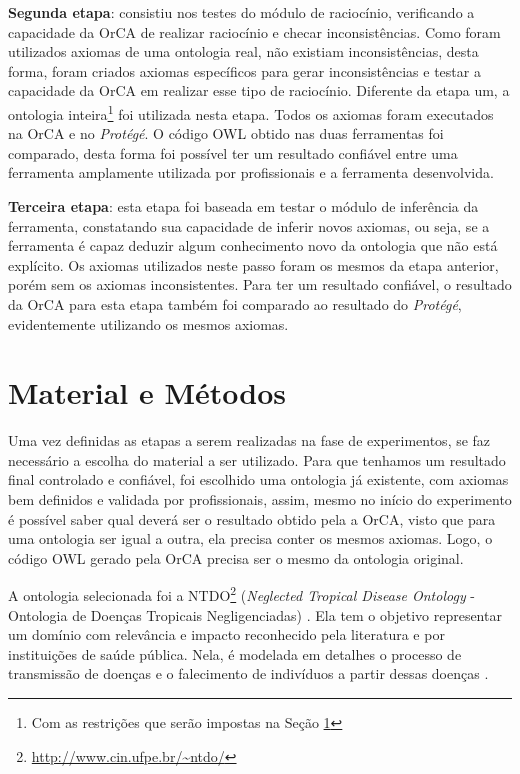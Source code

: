 \documentclass{bcc}
\begin{document}
\textbf{Segunda etapa}: consistiu nos testes do módulo de raciocínio, verificando a capacidade da OrCA de realizar raciocínio e checar inconsistências. Como foram utilizados axiomas de uma ontologia real, não existiam inconsistências, desta forma, foram criados axiomas específicos para gerar inconsistências e testar a capacidade da OrCA em realizar esse tipo de raciocínio. Diferente da etapa um, a ontologia inteira\footnote{Com as restrições que serão impostas na Seção \ref{sec:materialemetodo}} foi utilizada nesta etapa. Todos os axiomas foram executados na OrCA e no \textit{Protégé}. O código OWL obtido nas duas ferramentas foi comparado, desta forma foi possível ter um resultado confiável entre uma ferramenta amplamente utilizada por profissionais e a ferramenta desenvolvida.

\textbf{Terceira etapa}: esta etapa foi baseada em testar o módulo de inferência da ferramenta, constatando sua capacidade de inferir novos axiomas, ou seja, se a ferramenta é capaz deduzir algum conhecimento novo da ontologia que não está explícito. Os axiomas utilizados neste passo foram os mesmos da etapa anterior, porém sem os axiomas inconsistentes. Para ter um resultado confiável, o resultado da OrCA para esta etapa também foi comparado ao resultado do \textit{Protégé}, evidentemente utilizando os mesmos axiomas.

\section{Material e Métodos}
\label{sec:materialemetodo}

Uma vez definidas as etapas a serem realizadas na fase de experimentos, se faz necessário a escolha do material a ser utilizado. Para que tenhamos um resultado final controlado e confiável, foi escolhido uma ontologia já existente, com axiomas bem definidos e validada por profissionais, assim, mesmo no início do experimento é possível saber qual deverá ser o resultado obtido pela a OrCA, visto que para uma ontologia ser igual a outra, ela precisa conter os mesmos axiomas. Logo, o código OWL gerado pela OrCA precisa ser o mesmo da ontologia original. 

A ontologia selecionada foi a  NTDO\footnote{\url{http://www.cin.ufpe.br/\~ntdo/}} (\textit{Neglected Tropical Disease Ontology} - Ontologia de Doenças Tropicais Negligenciadas) \cite{ntdo}. Ela tem o objetivo representar um domínio com relevância e impacto reconhecido pela literatura e por instituições de saúde pública. Nela, é modelada em detalhes o processo de transmissão de doenças e o falecimento de indivíduos a partir dessas doenças \cite{ntdo}.
\end{document}
